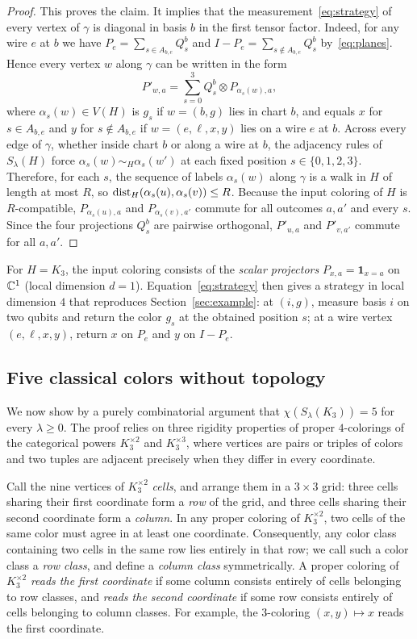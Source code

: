 \begin{proof}
This proves the claim. It implies that the measurement~\eqref{eq:strategy} of every vertex of $\gamma$ is diagonal in basis $b$ in the first tensor factor. Indeed, for any wire $e$ at $b$ we have $P_e=\sum_{s\in A_{b,e}} Q^b_s$ and $I-P_e=\sum_{s\notin A_{b,e}} Q^b_s$ by~\eqref{eq:planes}. Hence every vertex $w$ along $\gamma$ can be written in the form
\[
 P'_{w,a}=\sum_{s=0}^3 Q^b_s\otimes P_{\alpha_s(w),a},
\]
where $\alpha_s(w)\in V(H)$ is $g_s$ if $w=(b,g)$ lies in chart $b$, and equals $x$ for $s\in A_{b,e}$ and $y$ for $s\notin A_{b,e}$ if $w=(e,\ell,x,y)$ lies on a wire $e$ at $b$. Across every edge of $\gamma$, whether inside chart $b$ or along a wire at $b$, the adjacency rules of $S_\lambda(H)$ force $\alpha_s(w)\sim_H \alpha_s(w')$ at each fixed position $s\in\{0,1,2,3\}$. Therefore, for each $s$, the sequence of labels $\alpha_s(w)$ along $\gamma$ is a walk in $H$ of length at most $R$, so $\operatorname{dist}_H(\alpha_s(u),\alpha_s(v))\le R$. Because the input coloring of $H$ is $R$-compatible, $P_{\alpha_s(u),a}$ and $P_{\alpha_s(v),a'}$ commute for all outcomes $a,a'$ and every $s$. Since the four projections $Q^b_s$ are pairwise orthogonal, $P'_{u,a}$ and $P'_{v,a'}$ commute for all $a,a'$.
\end{proof}

For $H=K_3$, the input coloring consists of the \emph{scalar projectors} $P_{x,a}=\mathbf 1_{x=a}$ on $\mathbb C^1$ (local dimension $d=1$). Equation~\eqref{eq:strategy} then gives a strategy in local dimension $4$ that reproduces Section~\ref{sec:example}: at $(i,g)$, measure basis $i$ on two qubits and return the color $g_s$ at the obtained position $s$; at a wire vertex $(e,\ell,x,y)$, return $x$ on $P_e$ and $y$ on $I-P_e$.

\subsection{Five classical colors without topology}\label{sec:five}

We now show by a purely combinatorial argument that $\chi(S_\lambda(K_3))=5$ for every $\lambda\ge0$. The proof relies on three rigidity properties of proper $4$-colorings of the categorical powers $K_3^{\times2}$ and $K_3^{\times3}$, where vertices are pairs or triples of colors and two tuples are adjacent precisely when they differ in every coordinate.

Call the nine vertices of $K_3^{\times2}$ \emph{cells}, and arrange them in a $3\times3$ grid: three cells sharing their first coordinate form a \emph{row} of the grid, and three cells sharing their second coordinate form a \emph{column}. In any proper coloring of $K_3^{\times2}$, two cells of the same color must agree in at least one coordinate. Consequently, any color class containing two cells in the same row lies entirely in that row; we call such a color class a \emph{row class}, and define a \emph{column class} symmetrically. A proper coloring of $K_3^{\times2}$ \emph{reads the first coordinate} if some column consists entirely of cells belonging to row classes, and \emph{reads the second coordinate} if some row consists entirely of cells belonging to column classes. For example, the $3$-coloring $(x,y)\mapsto x$ reads the first coordinate.


